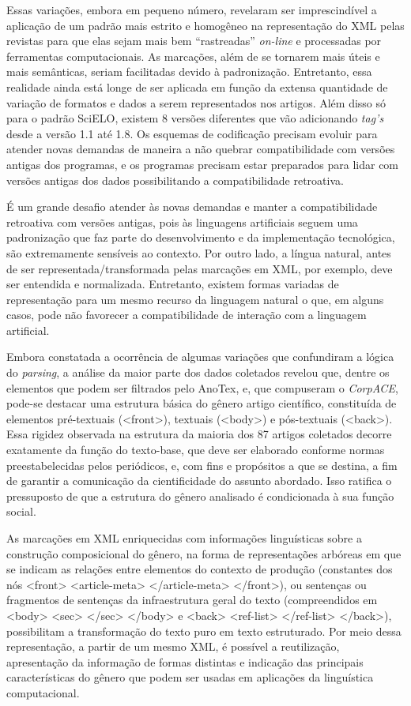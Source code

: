 \documentclass[portuguese]{textolivre}
\begin{document}
Essas variações, embora em pequeno número, revelaram ser imprescindível a aplicação de um padrão mais estrito e homogêneo na representação do XML pelas revistas para que elas sejam mais bem “rastreadas” \textit{on-line} e processadas por ferramentas computacionais. As marcações, além de se tornarem mais úteis e mais semânticas, seriam facilitadas devido à padronização. Entretanto, essa realidade ainda está longe de ser aplicada em função da extensa quantidade de variação de formatos e dados a serem representados nos artigos. Além disso só para o padrão SciELO, existem 8 versões diferentes que vão adicionando \textit{tag’s} desde a versão 1.1 até 1.8. Os esquemas de codificação precisam evoluir para atender novas demandas de maneira a não quebrar compatibilidade com versões antigas dos programas, e os programas precisam estar preparados para lidar com versões antigas dos dados possibilitando a compatibilidade retroativa.

É um grande desafio atender às novas demandas e manter a compatibilidade retroativa com versões antigas, pois às linguagens artificiais seguem uma padronização que faz parte do desenvolvimento e da implementação tecnológica, são extremamente sensíveis ao contexto. Por outro lado, a língua natural, antes de ser representada/transformada pelas marcações em XML, por exemplo, deve ser entendida e normalizada. Entretanto, existem formas variadas de representação para um mesmo recurso da linguagem natural o que, em alguns casos, pode não favorecer a compatibilidade de interação com a linguagem artificial.

Embora constatada a ocorrência de algumas variações que confundiram a lógica do \textit{parsing}, a análise da maior parte dos dados coletados revelou que, dentre os elementos que podem ser filtrados pelo AnoTex, e, que compuseram o \textit{CorpACE}, pode-se destacar uma estrutura básica do gênero artigo científico, constituída de elementos pré-textuais (<front>), textuais (<body>) e pós-textuais (<back>). Essa rigidez observada na estrutura da maioria dos 87 artigos coletados decorre exatamente da função do texto-base, que deve ser elaborado conforme normas preestabelecidas pelos periódicos, e, com fins e propósitos a que se destina, a fim de garantir a comunicação da cientificidade do assunto abordado. Isso ratifica o pressuposto de que a estrutura do gênero analisado é condicionada à sua função social.

As marcações em XML enriquecidas com informações linguísticas sobre a construção composicional do gênero, na forma de representações arbóreas em que se indicam as relações entre elementos do contexto de produção (constantes dos nós <front>  <article-meta> </article-meta> </front>), ou sentenças ou fragmentos de sentenças da infraestrutura geral do texto (compreendidos em <body> <sec> </sec> </body> e  <back> <ref-list> </ref-list> </back>), possibilitam a transformação do texto puro em texto estruturado. Por meio dessa representação, a partir de um mesmo XML, é possível a reutilização, apresentação da informação de formas distintas e indicação das principais características do gênero que podem ser usadas em aplicações da linguística computacional.
\end{document}
